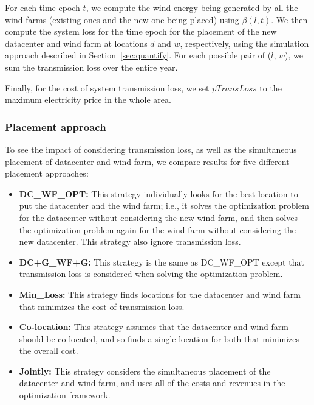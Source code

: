 For each time epoch $t$, we compute the wind energy being generated by all the wind farms (existing ones and the new one being placed) using $\beta(l,t)$.  We then compute the system loss for the time epoch for the placement of the new datacenter and wind farm at locations $d$ and $w$, respectively, using the simulation approach described in Section~\ref{sec:quantify}.  For each possible pair of ($l$, $w$), we sum the transmission loss over the entire year.

Finally, for the cost of system transmission loss, we set $pTransLoss$ to the maximum electricity price in the whole area.  

\subsubsection{Placement approach}

To see the impact of considering transmission loss, as well as the simultaneous placement of datacenter and wind farm, we compare results for five different placement approaches:

\begin{itemize}

\item \textbf{DC\_WF\_OPT:} This strategy individually looks for the best location to put the datacenter and the wind farm; i.e., it solves the optimization problem for the datacenter without considering the new wind farm, and then solves the optimization problem again for the wind farm without considering the new datacenter.  This strategy also ignore transmission loss.

\item \textbf{DC+G\_WF+G:} This strategy is the same as DC\_WF\_OPT except that transmission loss is considered when solving the optimization problem.

\item \textbf{Min\_Loss:} This strategy finds locations for the datacenter and wind farm that minimizes the cost of transmission loss.

\item \textbf{Co-location:} This strategy assumes that the datacenter and wind farm
should be co-located, and so finds a single location for both that minimizes the overall cost.

\item \textbf{Jointly:} This strategy considers the simultaneous placement of the datacenter and wind farm, and uses all of the costs and revenues in the optimization framework.

\end{itemize}

